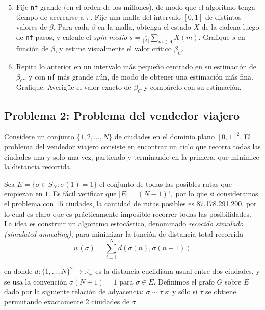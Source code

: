 \begin{enumerate}
	\setcounter{enumi}{4}
      \item Fije \texttt{nf} grande (en el orden de los millones), de modo que el algoritmo tenga tiempo de acercarse a $\pi$. Fije una malla del intervalo $[0,1]$ de distintos valores de $\beta$. Para cada $\beta$ en la malla, obtenga el estado $X$ de la cadena luego de \texttt{nf} pasos, y calcule el \emph{spin medio} $s = \frac{1}{|\Lambda|} \sum_{m\in \Lambda} X(m)$. Grafique $s$ en función de $\beta$, y estime visualmente el valor crítico $\beta_C$.
	
	\item Repita lo anterior en un intervalo más pequeño centrado en su estimación de $\beta_C$, y con \texttt{nf} más grande aún, de modo de obtener una estimación más fina. Grafique. Averigüe el valor exacto de $\beta_C$ y compárelo con su estimación.
\end{enumerate}


\subsection*{Problema 2: Problema del vendedor viajero}

Considere un conjunto $\{1,2,...,N\}$ de ciudades en el dominio plano $[0,1]^2$. El problema del vendedor viajero consiste en encontrar un ciclo que recorra todas las ciudades una y solo una vez, partiendo y terminando en la primera, que
minimice la distancia recorrida.

Sea $E=\{\sigma \in S_{N}:\sigma (1)=1\}$ el conjunto de todas las posibles rutas que empiezan en $1$. Es fácil verificar que $|E| =(N-1)!,$ por lo que si consideramos el problema con $15$ ciudades, la cantidad de rutas posibles es 87.178.291.200, por lo cual es claro que es prácticamente imposible recorrer todas las posibilidades. La idea es construir un algoritmo estocástico, denominado \emph{recocido simulado (simulated annealing)}, para minimizar la función de
distancia total recorrida
\begin{equation*}
w(\sigma )=\sum_{i=1}^{N}d(\sigma (n),\sigma (n+1))
\end{equation*}

\noindent en donde $d:\{1,...,N\}^{2}\rightarrow \mathbb{R}_{+}$ es la distancia euclidiana usual entre dos ciudades, y se usa la
convención $\sigma(N+1)=1$ para $\sigma \in E.$ Definimos el grafo $G$ sobre $E$ dado por la siguiente relación de adyacencia: $\sigma \sim \tau$ si y sólo si $\tau$ se obtiene permutando exactamente 2 ciuidades de $\sigma$.

